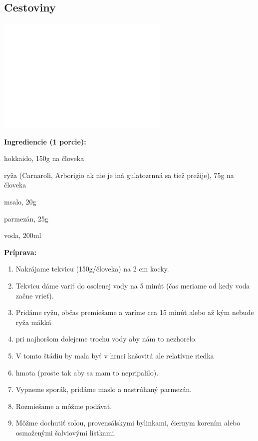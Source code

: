 \setcounter{step}{0}

\subsection{ Cestoviny }

\begin{ingredient}
  
      \includegraphics[height=5.5cm]{images/florentin}
  
  \def\portions{  }
  \textbf{ {\normalsize Ingrediencie (1 porcie):} }

  \begin{main}
      \item hokkaido, 150g na človeka
      \item ryža (Carnaroli, Arborigio ak nie je iná gulatozrnná sa tiež prežije), 75g na človeka
      \item msalo, 20g
      \item parmezán, 25g
      \item voda, 200ml
  \end{main}
  
\end{ingredient}
\begin{recipe}
\textbf{ {\normalsize Príprava:} }
\begin{enumerate}

  \item{Nakrájame tekvicu (150g/človeka) na 2 cm kocky.}
  \item{Tekvicu dáme variť do osolenej vody na 5 minút (čas meriame od kedy voda začne vrieť).}
  \item{Pridáme ryžu, občas premiešame a varíme cca 15 minút alebo až kým nebude ryža mäkká}
  \item{pri najhoršom dolejeme trochu vody aby nám to nezhorelo.}
  \item{V tomto štádiu by mala byť v hrnci kašovitá ale relatívne riedka}
  \item{hmota (proste tak aby sa mam to nepripalilo).}
  \item{Vypneme sporák, pridáme maslo a nastrúhaný parmezán.}
  \item{Rozmiešame a môžme podávať.}
  \item{Môžme dochutiť soľou, provensálskymi bylinkami, čiernym korením alebo osmaženými šalviovými lístkami.}

\end{enumerate}
\end{recipe}

\begin{notes}
  
\end{notes}	
\clearpage
